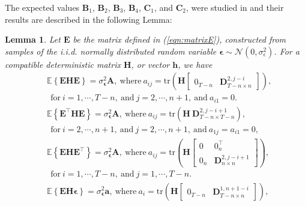 The expected values $\mathbf{B}_1$, $\mathbf{B}_2$, $\mathbf{B}_3$, $\mathbf{B}_4$, $\mathbf{C}_1$, and $\mathbf{C}_2$, were studied in \cite{Quintana19} and their results are described in the following Lemma:

\newtheorem{thm}{Theorem}
\newtheorem{lem}[thm]{Lemma}

\normalsize %

\begin{lem}{\small}\label{lem:lemma1}
Let $\mathbf{E}$ be the matrix defined in (\ref{eqn:matrixE}),
constructed from samples of the i.i.d. normally distributed random variable $\bm{\epsilon} \sim \mathcal{N}(0, \sigma_\epsilon^2)$.
For a compatible deterministic matrix $\mathbf{H}$, or vector $\mathbf{h}$, we have
\begin{equation*} \begin{aligned} 
& \mathbb{E} \left\{ \mathbf{E} \mathbf{H} \mathbf{E} \right\} = \sigma_{\bm{\epsilon}}^2 \mathbf{A}, \
\text{where} \ a_{ij} = \mathrm{tr} \left( \mathbf{H} \begin{bmatrix} 0_{T-n} & \mathbf{D}_{T-n \times n}^{2, j-i} \end{bmatrix} \right), \\
& \ \ \text{for}  \ i = 1, \cdots, T-n, \ \text{and} \ j = 2, \cdots, n+1, \ \text{and} \ a_{i1} = 0. \\
& \mathbb{E} \left\{ \mathbf{E}^\top \mathbf{H} \mathbf{E} \right\} = \sigma_{\bm{\epsilon}}^2 \mathbf{A}, \ 
\text{where} \ a_{ij} = \mathrm{tr} \left( \mathbf{H} \ \mathbf{D}_{T-n \times T-n}^{2, j-i+1} \right)  , \\
& \ \ \text{for} \ i = 2, \cdots, n+1, \ \text{and} \ j=2, \cdots, n+1 , \ \text{and} \   a_{1j} = a_{i1} = 0,  \\ 
& \mathbb{E} \left\{ \mathbf{E} \mathbf{H} \mathbf{E}^\top \right\} = \sigma_{\bm{\epsilon}}^2 \mathbf{A}, \
\text{where} \ a_{ij} = \mathrm{tr} \left( \mathbf{H} \begin{bmatrix} 0 & 0_{n}^\top \\ 0_{n} & \mathbf{D}_{n \times n}^{2, j-i+1} \end{bmatrix} \right), \\
& \ \ \text{for} \ i = 1,\cdots,T-n, \ \text{and} \ j=1,\cdots,T-n. \\ 
& \mathbb{E} \left\{ \mathbf{E} \mathbf{H} \bm{\epsilon} \right\} = \sigma_{\bm{\epsilon}}^2 \mathbf{a} , \
\text{where} \ a_i = \mathrm{tr} \left( \mathbf{H} \begin{bmatrix} 0_{T-n} & \mathbf{D}_{T-n \times n}^{1,n+1-i} \end{bmatrix} \right) , \\

\end{aligned}
\end{equation*}
\end{lem}
